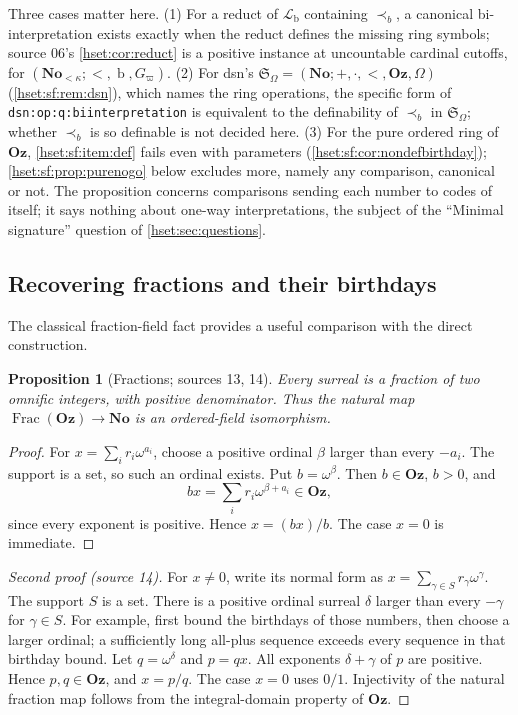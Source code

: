 \documentclass[11pt,letterpaper]{article}
\newtheorem{proposition}[proposition]{Proposition}\aliascntresetthe{proposition}
\theoremstyle{definition}
\theoremstyle{remark}
\newcommand{\No}{\mathbf{No}}
\newcommand{\bd}{\operatorname{b}}
\newcommand{\lbl}[1]{\nolinkurl{#1}}
\newcommand{\Oz}{\mathbf{Oz}}
\newcommand{\Frac}{\operatorname{Frac}}
\newcommand{\precb}{\prec_b}
\newcommand{\Lb}{\mathcal L_{\mathrm b}}
\begin{document}
Three cases matter here. (1) For a reduct of $\Lb$ containing $\precb$, a
canonical bi-interpretation exists exactly when the reduct defines the missing ring
symbols; source 06's \cref{hset:cor:reduct} is a positive instance at uncountable
cardinal cutoffs, for $(\No_{<\kappa};<,\bd,G_\varpi)$. (2) For dsn's
$\mathfrak S_\Omega=(\No;+,\cdot,<,\Oz,\Omega)$ (\cref{hset:sf:rem:dsn}), which
names the ring operations, the specific form of
\lbl{dsn:op:q:biinterpretation} is equivalent to the definability of $\precb$ in
$\mathfrak S_\Omega$; whether $\precb$ is so definable is not decided here. (3) For
the pure ordered ring of $\Oz$, \ref{hset:sf:item:def} fails even with parameters
(\cref{hset:sf:cor:nondefbirthday}); \cref{hset:sf:prop:purenogo} below excludes more,
namely any comparison, canonical or not. The proposition concerns comparisons
sending each number to codes of itself; it says nothing about one-way
interpretations, the subject of the ``Minimal signature'' question of
\cref{hset:sec:questions}.

\subsection{Recovering fractions and their birthdays}

The classical fraction-field fact provides a useful comparison with the direct
construction.

\begin{proposition}[Fractions; sources 13, 14]\label{hset:sf:prop:fractions}
Every surreal is a fraction of two omnific integers, with positive denominator.
Thus the natural map $\Frac(\Oz)\to\No$ is an ordered-field isomorphism.
\end{proposition}
\begin{proof}
For $x=\sum_i r_i\omega^{a_i}$, choose a positive ordinal $\beta$ larger than every
$-a_i$. The support is a set, so such an ordinal exists. Put $b=\omega^\beta$. Then
$b\in\Oz$, $b>0$, and
\[
 bx=\sum_i r_i\omega^{\beta+a_i}\in\Oz,
\]
since every exponent is positive. Hence $x=(bx)/b$. The case $x=0$ is immediate.
\end{proof}

\begin{proof}[Second proof (source 14)]
For $x\ne0$, write its normal form as $x=\sum_{\gamma\in S}r_\gamma\omega^\gamma$.
The support $S$ is a set. There is a positive ordinal surreal $\delta$ larger than
every $-\gamma$ for $\gamma\in S$. For example, first bound the birthdays of those
numbers, then choose a larger ordinal; a sufficiently long all-plus sequence
exceeds every sequence in that birthday bound. Let $q=\omega^\delta$ and $p=qx$. All
exponents $\delta+\gamma$ of $p$ are positive. Hence $p,q\in\Oz$, and $x=p/q$. The
case $x=0$ uses $0/1$. Injectivity of the natural fraction map follows from the
integral-domain property of $\Oz$.
\end{proof}
\end{document}
